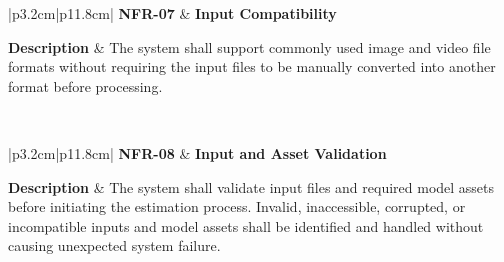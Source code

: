 
\begin{table}[H]
	\centering
	\renewcommand{\arraystretch}{1.25}
	\begin{tabular}{|p{3.2cm}|p{11.8cm}|}
		\hline
		\textbf{NFR-07} &
		\textbf{Input Compatibility} \\ \hline
		
		\textbf{Description} &
		The system shall support commonly used image and video file formats without requiring the input files to be manually converted into another format before processing. \\ \hline
		
		 \\ \hline
	\end{tabular}
	\caption{Non-functional requirement for input compatibility.}
	\label{tab:nfr07}
\end{table}


\begin{table}[H]
	\centering
	\renewcommand{\arraystretch}{1.25}
	\begin{tabular}{|p{3.2cm}|p{11.8cm}|}
		\hline
		\textbf{NFR-08} &
		\textbf{Input and Asset Validation} \\ \hline
		
		\textbf{Description} &
		The system shall validate input files and required model assets before initiating the estimation process. Invalid, inaccessible, corrupted, or incompatible inputs and model assets shall be identified and handled without causing unexpected system failure. \\ \hline
		
		 \\ \hline
	\end{tabular}
	\caption{Non-functional requirement for input and model asset validation.}
	\label{tab:nfr08}
\end{table}

